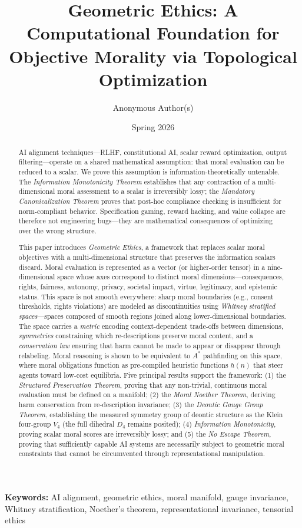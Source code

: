 \documentclass[12pt,letterpaper]{article}
\title{\textbf{Geometric Ethics: A Computational Foundation for\\Objective Morality via Topological Optimization}}
\author{Anonymous Author(s)}
\date{Spring 2026}
\theoremstyle{definition}
\theoremstyle{remark}
\begin{document}
\maketitle

\noindent\textbf{Keywords:} AI alignment, geometric ethics, moral manifold, gauge invariance, Whitney stratification, Noether's theorem, representational invariance, tensorial ethics

\begin{abstract}
AI alignment techniques---RLHF, constitutional AI, scalar reward optimization, output filtering---operate on a shared mathematical assumption: that moral evaluation can be reduced to a scalar. We prove this assumption is information-theoretically untenable. The \emph{Information Monotonicity Theorem} establishes that any contraction of a multi-dimensional moral assessment to a scalar is irreversibly lossy; the \emph{Mandatory Canonicalization Theorem} proves that post-hoc compliance checking is insufficient for norm-compliant behavior. Specification gaming, reward hacking, and value collapse are therefore not engineering bugs---they are mathematical consequences of optimizing over the wrong structure.

This paper introduces \emph{Geometric Ethics}, a framework that replaces scalar moral objectives with a multi-dimensional structure that preserves the information scalars discard. Moral evaluation is represented as a vector (or higher-order tensor) in a nine-dimensional space whose axes correspond to distinct moral dimensions---consequences, rights, fairness, autonomy, privacy, societal impact, virtue, legitimacy, and epistemic status. This space is not smooth everywhere: sharp moral boundaries (e.g., consent thresholds, rights violations) are modeled as discontinuities using \emph{Whitney stratified spaces}---spaces composed of smooth regions joined along lower-dimensional boundaries. The space carries a \emph{metric} encoding context-dependent trade-offs between dimensions, \emph{symmetries} constraining which re-descriptions preserve moral content, and a \emph{conservation law} ensuring that harm cannot be made to appear or disappear through relabeling. Moral reasoning is shown to be equivalent to $A^*$ pathfinding on this space, where moral obligations function as pre-compiled heuristic functions $h(n)$ that steer agents toward low-cost equilibria. Five principal results support the framework: (1) the \emph{Structured Preservation Theorem}, proving that any non-trivial, continuous moral evaluation must be defined on a manifold; (2) the \emph{Moral Noether Theorem}, deriving harm conservation from re-description invariance; (3) the \emph{Deontic Gauge Group Theorem}, establishing the measured symmetry group of deontic structure as the Klein four-group $V_4$ (the full dihedral $D_4$ remains posited); (4) \emph{Information Monotonicity}, proving scalar moral scores are irreversibly lossy; and (5) the \emph{No Escape Theorem}, proving that sufficiently capable AI systems are necessarily subject to geometric moral constraints that cannot be circumvented through representational manipulation.


\end{abstract}
\end{document}
